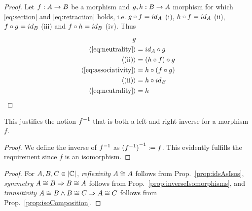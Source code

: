 \begin{proof}
Let $\arrow{A}{f}{B}$ be a morphism and $\arrow{B}{g,h}{A}$ morphism for which \ref{eq:section} and \ref{eq:retraction} holds, i.e. $\compose{f}{g} = \identity{A}$ (i), $\compose{f}{h} = \identity{A}$ (ii), $\compose{g}{f} = \identity{B}$ (iii) and $\compose{h}{f} = \identity{B}$ (iv).
Thus
\begin{align*}
	g & \\
	\proofStep{\ref{eq:neutrality}} & = \compose{g}{\identity{A}}\\
	 \proofStep{(ii)} & = \compose{g}{(\compose{f}{h})}  \\
	 \proofStep{\ref{eq:associativity}} & = \compose{(\compose{g}{f})}{h} \\
	 \proofStep{(ii)} & = \compose{\identity{B}}{h} \\
	 \proofStep{\ref{eq:neutrality}} & = h
\end{align*} 
\end{proof}
This justifies the notion $\inverse{f}$ that is both a left and right inverse for a morphism $f$.	

\begin{proof}
We define the inverse of $\inverse{f}$ as $\inverse{(\inverse{f})} := f$.
This evidently fulfills the requirement since $f$ is an isomorphism.
\end{proof}

\begin{proof}
For $A, B, C \in \catObjects{\cat{C}}$, \emph{reflexivity} $A \isomorphic A$ follows from Prop.~\ref{prop:idsAsIsos}, \emph{symmetry} $A \isomorphic B \Rightarrow B \isomorphic A$ follows from Prop.~\ref{prop:inverseIsomorphisms}, and \emph{transitivity} $A \isomorphic B \wedge B \isomorphic C \Rightarrow A \isomorphic C$ follows from Prop.~\ref{prop:isoComposition}.
\end{proof}

